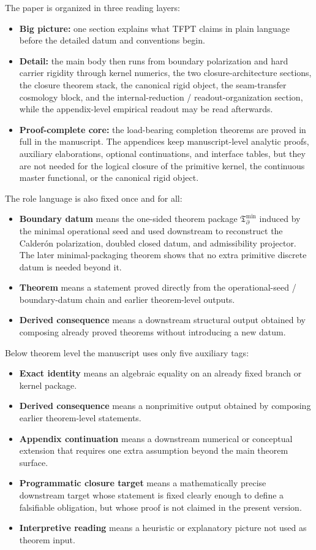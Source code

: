 \documentclass[11pt,a4paper]{article}
\theoremstyle{definition}
\theoremstyle{remark}
\newcommand{\Tbound}{\mathfrak T_{\partial}^{\min}}
\begin{document}
The paper is organized in three reading layers:
\begin{itemize}[leftmargin=1.5em, topsep=3pt, itemsep=2pt]
    \item \textbf{Big picture:} one section explains what TFPT claims in plain language before the detailed datum and conventions begin.
    \item \textbf{Detail:} the main body then runs from boundary polarization and hard carrier rigidity through kernel numerics, the two closure-architecture sections, the closure theorem stack, the canonical rigid object, the seam-transfer cosmology block, and the internal-reduction / readout-organization section, while the appendix-level empirical readout may be read afterwards.
    \item \textbf{Proof-complete core:} the load-bearing completion theorems are proved in full in the manuscript.
    The appendices keep manuscript-level analytic proofs, auxiliary elaborations, optional
    continuations, and interface tables, but they are not needed for the logical closure of the
    primitive kernel, the continuous master functional, or the canonical rigid object.
\end{itemize}
The role language is also fixed once and for all:
\begin{itemize}[leftmargin=1.5em, topsep=3pt, itemsep=2pt]
    \item \textbf{Boundary datum} means the one-sided theorem package $\Tbound$ induced by the minimal operational seed and used downstream to reconstruct the Calder\'on polarization, doubled closed datum, and admissibility projector. The later minimal-packaging theorem shows that no extra primitive discrete datum is needed beyond it.
    \item \textbf{Theorem} means a statement proved directly from the operational-seed / boundary-datum chain and earlier theorem-level outputs.
    \item \textbf{Derived consequence} means a downstream structural output obtained by composing already proved theorems without introducing a new datum.
\end{itemize}
Below theorem level the manuscript uses only five auxiliary tags:
\begin{itemize}[leftmargin=1.5em, topsep=3pt, itemsep=2pt]
    \item \textbf{Exact identity} means an algebraic equality on an already fixed branch or kernel package.
    \item \textbf{Derived consequence} means a nonprimitive output obtained by composing earlier theorem-level statements.
    \item \textbf{Appendix continuation} means a downstream numerical or conceptual extension that requires one extra assumption beyond the main theorem surface.
    \item \textbf{Programmatic closure target} means a mathematically precise downstream target whose statement is fixed clearly enough to define a falsifiable obligation, but whose proof is not claimed in the present version.
    \item \textbf{Interpretive reading} means a heuristic or explanatory picture not used as theorem input.
\end{itemize}
\end{document}
